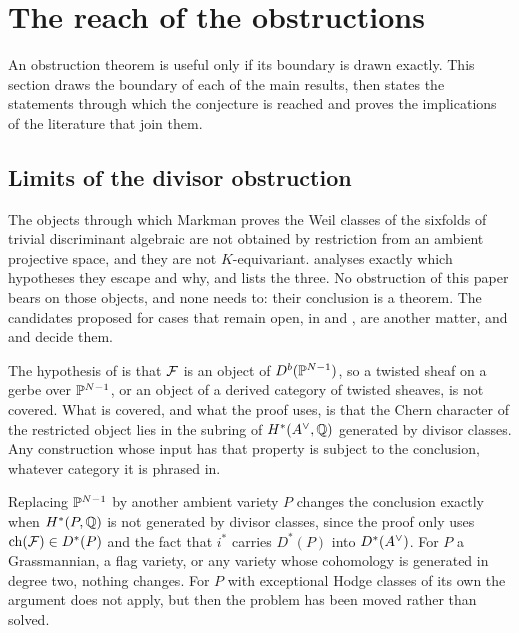 \section{The reach of the obstructions}\label{sec:scope}

An obstruction theorem is useful only if its boundary is drawn exactly. This
section draws the boundary of each of the main results, then states the
statements through which the conjecture is reached and proves the
implications of the literature that join them.

\subsection{Limits of the divisor obstruction}

\begin{remark}\label{rem:markmanscope}
The objects through which Markman proves the Weil classes of the sixfolds of
trivial discriminant algebraic \cite{Mar25a,Mar25b} are not obtained by
restriction from an ambient projective space, and they are not
$K$-equivariant.  analyses exactly which hypotheses they
escape and why, and  lists the three. No obstruction
of this paper bears on those objects, and none needs to: their conclusion is
a theorem. The candidates proposed for cases that remain open, in
\cite[Section~12]{Mar25b} and \cite[Example~11.2.7]{Mar25c}, are another
matter, and  and 
decide them.
\end{remark}

\begin{remark}\label{rem:twisted}
The hypothesis of  is that $\mathcal{F}$ is an object of
$D^{b}(\mathbb{P}^{N-1})$, so a twisted sheaf on a gerbe over $\mathbb{P}^{N-1}$, or an
object of a derived category of twisted sheaves, is not covered. What is
covered, and what the proof uses, is that the Chern character of the
restricted object lies in the subring of $H^{*}(A^{\vee},\mathbb{Q})$ generated by
divisor classes. Any construction whose input has that property is subject to
the conclusion, whatever category it is phrased in.
\end{remark}

\begin{remark}\label{rem:otherambient}
Replacing $\mathbb{P}^{N-1}$ by another ambient variety $P$ changes the conclusion
exactly when $H^{*}(P,\mathbb{Q})$ is not generated by divisor classes, since the
proof only uses $\operatorname{ch}(\mathcal{F})\in D^{*}(P)$ and the fact that $i^{*}$ carries
$D^{*}(P)$ into $D^{*}(A^{\vee})$. For $P$ a Grassmannian, a flag variety, or any
variety whose cohomology is generated in degree two, nothing changes. For $P$
with exceptional Hodge classes of its own the argument does not apply, but
then the problem has been moved rather than solved.
\end{remark}

